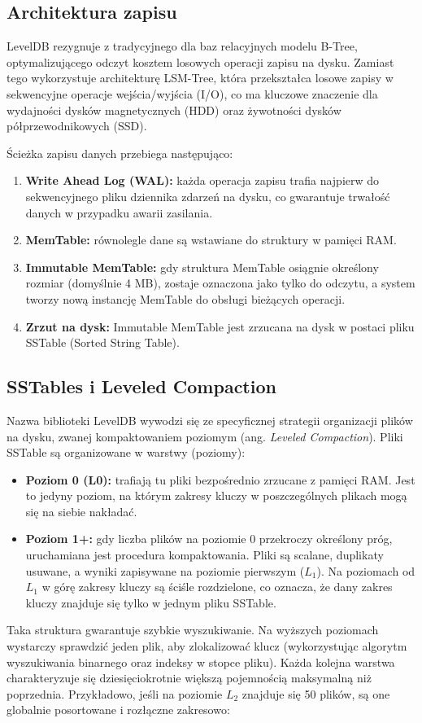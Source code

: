 \subsection{Architektura zapisu}
LevelDB rezygnuje z tradycyjnego dla baz relacyjnych modelu B-Tree, optymalizującego odczyt kosztem losowych operacji zapisu na dysku. Zamiast tego wykorzystuje architekturę LSM-Tree, która przekształca losowe zapisy w sekwencyjne operacje wejścia/wyjścia (I/O), co ma kluczowe znaczenie dla wydajności dysków magnetycznych (HDD) oraz żywotności dysków półprzewodnikowych (SSD).

Ścieżka zapisu danych przebiega następująco:
\begin{enumerate}
    \item \textbf{Write Ahead Log (WAL):} każda operacja zapisu trafia najpierw do sekwencyjnego pliku dziennika zdarzeń na dysku, co gwarantuje trwałość danych w przypadku awarii zasilania.
    \item \textbf{MemTable:} równolegle dane są wstawiane do struktury w pamięci RAM.
    \item \textbf{Immutable MemTable:} gdy struktura MemTable osiągnie określony rozmiar (domyślnie 4 MB), zostaje oznaczona jako tylko do odczytu, a system tworzy nową instancję MemTable do obsługi bieżących operacji.
    \item \textbf{Zrzut na dysk:} Immutable MemTable jest zrzucana na dysk w postaci pliku SSTable (Sorted String Table).
\end{enumerate}
\subsection{SSTables i Leveled Compaction}
Nazwa biblioteki LevelDB wywodzi się ze specyficznej strategii organizacji plików na dysku, zwanej kompaktowaniem poziomym (ang. \emph{Leveled Compaction}). Pliki SSTable są organizowane w warstwy (poziomy):
\begin{itemize}
    \item \textbf{Poziom 0 (L0):} trafiają tu pliki bezpośrednio zrzucane z pamięci RAM. Jest to jedyny poziom, na którym zakresy kluczy w poszczególnych plikach mogą się na siebie nakładać.
    \item \textbf{Poziom 1+:} gdy liczba plików na poziomie 0 przekroczy określony próg, uruchamiana jest procedura kompaktowania. Pliki są scalane, duplikaty usuwane, a wyniki zapisywane na poziomie pierwszym ($L_1$). Na poziomach od $L_1$ w górę zakresy kluczy są ściśle rozdzielone, co oznacza, że dany zakres kluczy znajduje się tylko w jednym pliku SSTable.
\end{itemize}
Taka struktura gwarantuje szybkie wyszukiwanie. Na wyższych poziomach wystarczy sprawdzić jeden plik, aby zlokalizować klucz (wykorzystując algorytm wyszukiwania binarnego oraz indeksy w stopce pliku). Każda kolejna warstwa charakteryzuje się dziesięciokrotnie większą pojemnością maksymalną niż poprzednia. Przykładowo, jeśli na poziomie $L_2$ znajduje się 50 plików, są one globalnie posortowane i rozłączne zakresowo:

